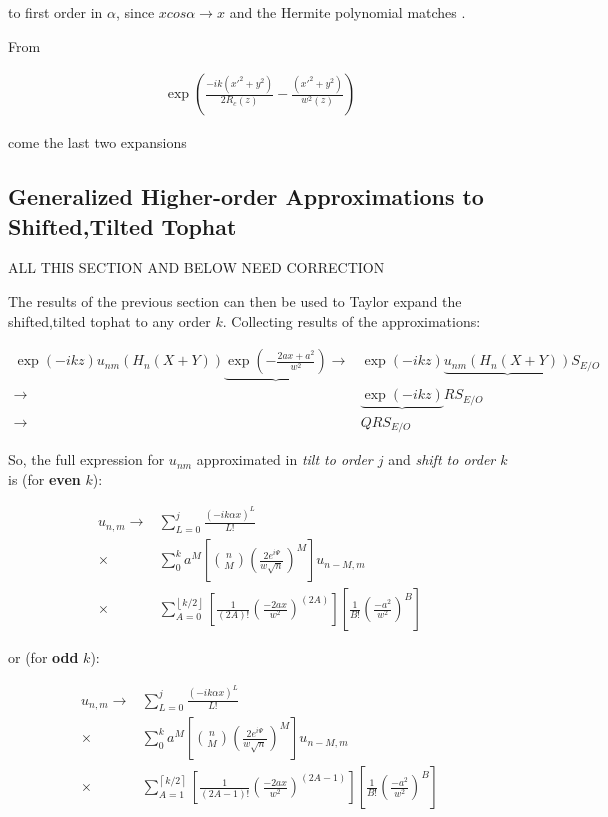 \documentclass[aps,twoside,secnumarabic,balancelastpage,amsmath,amssymb,nofootinbib,hyperref=pdftex]{revtex4}
\newcommand{\floor}[1]{\left\lfloor #1 \right\rfloor}
\newcommand{\ceil}[1]{\left\lceil #1 \right\rceil}
\begin{document}
to first order in $\alpha$, since $x cos\alpha \rightarrow x$ and the Hermite polynomial matches .


From 

\begin{align*}
\exp( \frac{-ik(x'^2+y^2)}{2 R_c(z)}  -
\frac{(x'^2+y^2)}{w^2(z)} )
\end{align*}

come the last two expansions



\clearpage

\subsection{Generalized Higher-order Approximations to Shifted,Tilted Tophat }

ALL THIS SECTION AND BELOW NEED CORRECTION

The results of the previous section can then be used to Taylor expand the shifted,tilted tophat to any order $k$. Collecting results of the approximations:

\begin{align*}
	\exp(-ikz) 
	u_{nm}(H_n(X+Y)) 
	\underbrace{\exp(-\frac{2ax+a^2}{w^2})}
	\rightarrow&
	\exp(-ikz) 
	\underbrace{u_{nm}(H_n(X+Y))}
	  S_{E/O}
	\\ \rightarrow &
	\underbrace{\exp(-ikz)}
	R S_{E/O}
	\\ \rightarrow &
	Q R S_{E/O}
\end{align*}

So, the full expression for $u_{nm}$ approximated in \emph{tilt to order $j$} and \emph{shift to order $k$} is (for \textbf{even} $k$):

\begin{align*}
	u_{n,m} \rightarrow	&
	\sum_{L=0}^j
	\frac{(-ik\alpha x)^L}{L!}
	\\ \times &
	\sum_0^k
a^M
\left[
{n \choose M}
(\frac{2e^{i\Psi}}{w\sqrt{n}})^M
\right]
u_{n-M,m}
\\ \times &
\sum_{A=0}^{\floor{k/2}}
[
	\frac{1}{(2A)!}(\frac{-2ax}{w^2})^{(2A)}
]
[
	\frac{1}{B!}(\frac{-a^2}{w^2})^B
]
\end{align*}

or (for \textbf{odd} $k$):

\begin{align*}
	u_{n,m} \rightarrow	 &
	\sum_{L=0}^j
	\frac{(-ik\alpha x)^L}{L!}
	\\ \times &
	\sum_0^k
a^M
\left[
{n \choose M}
(\frac{2e^{i\Psi}}{w\sqrt{n}})^M
\right]u_{n-M,m}
\\ \times &
\sum_{A=1}^{\ceil{k/2}}
[
	\frac{1}{(2A-1)!}(\frac{-2ax}{w^2})^{(2A-1)}
]
[
	\frac{1}{B!}(\frac{-a^2}{w^2})^B
]
\end{align*}
\end{document}
